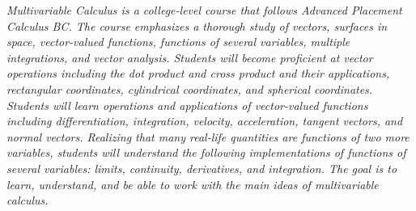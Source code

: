 \vspace{1mm}\emph{Multivariable Calculus is a college-level course that follows Advanced Placement Calculus BC. The course emphasizes a thorough study of vectors, surfaces in space, vector-valued functions, functions of several variables, multiple integrations, and vector analysis. Students will become proficient at vector operations including the dot product and cross product and their applications, rectangular coordinates, cylindrical coordinates, and spherical coordinates. Students will learn operations and applications of vector-valued functions including differentiation, integration, velocity, acceleration, tangent vectors, and normal vectors. Realizing that many real-life quantities are functions of two more variables, students will understand the following implementations of functions of several variables: limits, continuity, derivatives, and integration. The goal is to learn, understand, and be able to work with the main ideas of multivariable calculus.}\\


